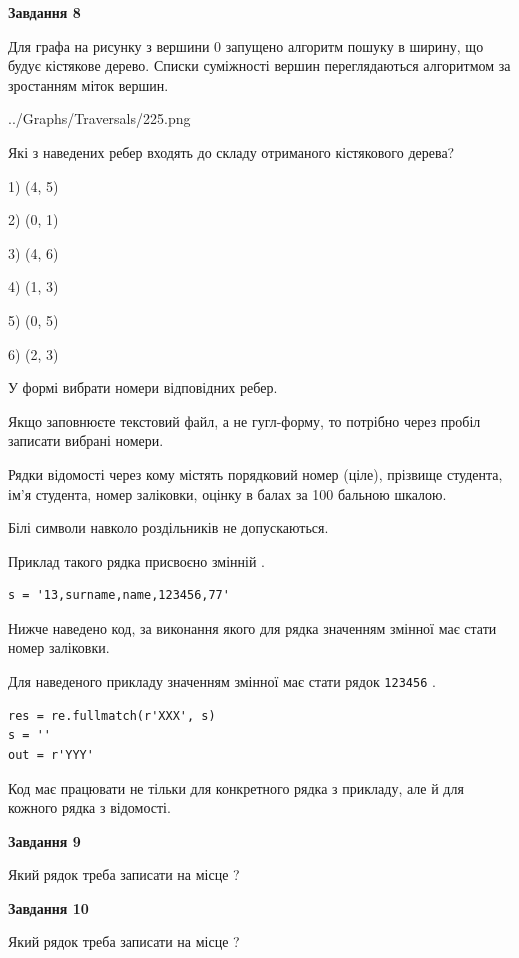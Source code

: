 \documentclass[12pt, ukrainian]{article}
\def\code#1{\Verb!#1!}
\begin{document}
{\begin {large}
{\begin {center}\textbf{Завдання 8}\end {center}}\par
Для графа на рисунку з вершини 0 запущено алгоритм пошуку в ширину, що будує кістякове дерево. Списки суміжності вершин переглядаються алгоритмом за зростанням міток вершин.\par
\begin{center}
	{../Graphs/Traversals/225.png}
\end{center}
\par Які з наведених ребер входять до складу отриманого кістякового дерева?\par
1) (4, 5)\par
2) (0, 1)\par
3) (4, 6)\par
4) (1, 3)\par
5) (0, 5)\par
6) (2, 3)\par
{\vskip 15pt} У формі вибрати номери відповідних ребер.


Якщо заповнюєте текстовий файл, а не гугл-форму, то потрібно через пробіл записа\-ти вибрані номери.\par
\newpage


Рядки відомості через кому містять порядковий номер (ціле), пріз\-ви\-ще студен\-та, ім'я студента, номер заліковки, оцінку в балах за 100 бальною шкалою.

Білі символи навколо роздільників не допускаються.

Приклад такого рядка присвоєно змінній .



\begin{verbatim}
s = '13,surname,name,123456,77'
\end{verbatim}


Нижче наведено код, за виконання якого для рядка  значенням змінної  має стати номер заліковки.

Для наведеного прикладу значенням змінної  має стати рядок \code{123456} .



\begin{verbatim}
res = re.fullmatch(r'XXX', s)
s = ''
out = r'YYY'
\end{verbatim}


Код має працювати не тільки для конкретного рядка з прикладу, але й для кожного рядка з відомості.

{\begin {center}\textbf{Завдання 9}\end {center}}\par
Який рядок треба записати на місце  ?\par
\vspace{5mm}


{\begin {center}\textbf{Завдання 10}\end {center}}\par
Який рядок треба записати на місце  ?\par


\newpage


\end {large}}
\end{document}
